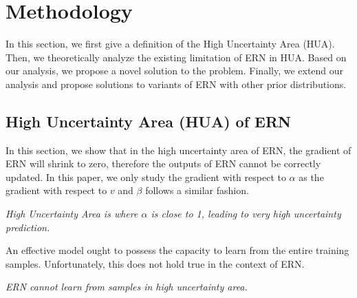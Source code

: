 \section{Methodology}
In this section, we first give a definition of the High Uncertainty Area (HUA). Then, we theoretically analyze the existing limitation of ERN in HUA. Based on our analysis, we propose a novel solution to the problem. Finally, we extend our analysis and propose solutions to variants of ERN with other prior distributions.

\subsection{High Uncertainty Area (HUA) of ERN}
In this section, we show that in the high uncertainty area of ERN, the gradient of ERN will shrink to zero, therefore the outputs of ERN cannot be correctly updated. In this paper, we only study the gradient with respect to $\alpha$ as the gradient with respect to $v$ and $\beta$ follows a similar fashion.
\begin{definition}
\textit{High Uncertainty Area is where $\alpha$ is close to 1, leading to very high uncertainty prediction.} 
\end{definition}


An effective model ought to possess the capacity to learn from the entire training samples. Unfortunately, this does not hold true in the context of ERN.
\begin{theorem}
\label{proof1}
\textit{ERN cannot learn from samples in high uncertainty area.}
\end{theorem}

